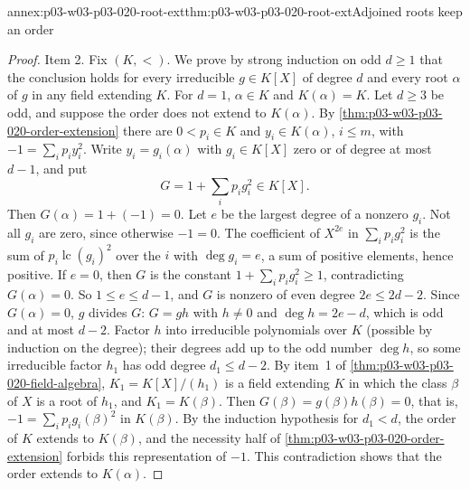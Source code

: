 \begin{annexitem}{annex:p03-w03-p03-020-root-ext}{thm:p03-w03-p03-020-root-ext}{Adjoined roots keep an order}
\begin{proof}
Item 2. Fix \((K,<)\). We prove by strong induction on odd \(d\ge1\) that
the conclusion holds for every irreducible \(g\in K[X]\) of degree \(d\) and
every root \(\alpha\) of \(g\) in any field extending \(K\). For \(d=1\),
\(\alpha\in K\) and \(K(\alpha)=K\). Let \(d\ge3\) be odd, and suppose the
order does not extend to \(K(\alpha)\). By
\cref{thm:p03-w03-p03-020-order-extension} there are \(0<p_i\in K\) and
\(y_i\in K(\alpha)\), \(i\le m\), with \(-1=\sum_ip_iy_i^2\). Write
\(y_i=g_i(\alpha)\) with \(g_i\in K[X]\) zero or of degree at most
\(d-1\), and put
\[
G=1+\sum_ip_ig_i^2\in K[X].
\]
Then \(G(\alpha)=1+(-1)=0\). Let \(e\) be the largest degree of a nonzero
\(g_i\). Not all \(g_i\) are zero, since otherwise \(-1=0\). The coefficient
of \(X^{2e}\) in \(\sum_ip_ig_i^2\) is the sum of
\(p_i\operatorname{lc}(g_i)^2\) over the \(i\) with \(\deg g_i=e\), a sum
of positive elements, hence positive. If \(e=0\), then \(G\) is the
constant \(1+\sum_ip_ig_i^2\ge1\), contradicting \(G(\alpha)=0\). So
\(1\le e\le d-1\), and \(G\) is nonzero of even degree \(2e\le2d-2\).
Since \(G(\alpha)=0\), \(g\) divides \(G\): \(G=gh\) with \(h\ne0\) and
\(\deg h=2e-d\), which is odd and at most \(d-2\). Factor \(h\) into
irreducible polynomials over \(K\) (possible by induction on the degree);
their degrees add up to the odd number \(\deg h\), so some irreducible
factor \(h_1\) has odd degree \(d_1\le d-2\). By item~1 of
\cref{thm:p03-w03-p03-020-field-algebra}, \(K_1=K[X]/(h_1)\) is a field
extending \(K\) in which the class \(\beta\) of \(X\) is a root of \(h_1\),
and \(K_1=K(\beta)\). Then \(G(\beta)=g(\beta)h(\beta)=0\), that is,
\(-1=\sum_ip_ig_i(\beta)^2\) in \(K(\beta)\). By the induction hypothesis
for \(d_1<d\), the order of \(K\) extends to \(K(\beta)\), and the necessity
half of \cref{thm:p03-w03-p03-020-order-extension} forbids this
representation of \(-1\). This contradiction shows that the order extends to
\(K(\alpha)\).
\end{proof}
\end{annexitem}

